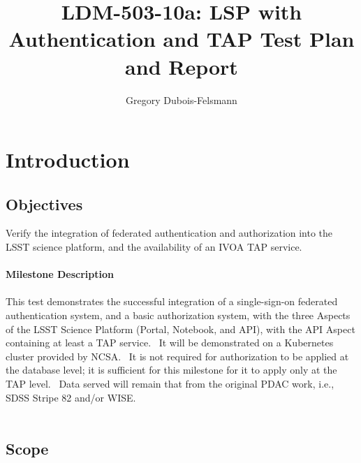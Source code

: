 \documentclass[DM,lsstdraft,STR,toc]{lsstdoc}
\begin{document}
\def\milestoneName{LSP with Authentication and TAP}
\def\milestoneId{LDM-503-10a:}
\def\product{LSP Services}


\title{ LDM-503-10a: LSP with Authentication and TAP Test Plan and Report}
\setDocRef{\lsstDocType-\lsstDocNum}
\date{\vcsdate}
\author{ Gregory Dubois-Felsmann }






\maketitle

\section{Introduction}
\label{sect:intro}


\subsection{Objectives}
\label{sect:objectives}

Verify the integration of federated authentication and authorization
into the LSST science platform, and the availability of an IVOA TAP
service.\\
~\\
\textbf{Milestone Description}\\
~\\
This test demonstrates the successful integration of a single-sign-on
federated authentication system, and a basic authorization system, with
the three Aspects of the LSST Science Platform (Portal, Notebook, and
API), with the API Aspect containing at least a TAP service. ~It will be
demonstrated on a Kubernetes cluster provided by NCSA. ~It is not
required for authorization to be applied at the database level; it is
sufficient for this milestone for it to apply only at the TAP level.
~Data served will remain that from the original PDAC work, i.e., SDSS
Stripe 82 and/or WISE.\\
~\\

\hypertarget{scope}{%
\subsection{Scope}\label{scope}}
\end{document}
